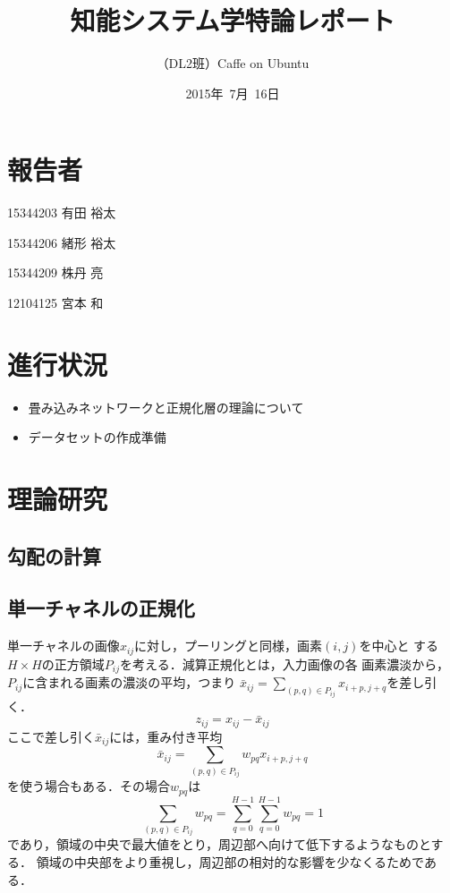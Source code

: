 \documentclass[a4paper,10pt]{jsarticle}
\title{知能システム学特論レポート}
\author{
（DL2班）Caffe on Ubuntu\\
}
\date{2015年\ 7月\ 16日}
\begin{document}
\maketitle
\section{報告者}
\begin{list}{}{}
 \item 15344203\hspace{0.5cm} 有田 裕太
 \item 15344206\hspace{0.5cm} 緒形 裕太
 \item 15344209\hspace{0.5cm} 株丹 亮
 \item 12104125\hspace{0.5cm} 宮本 和
\end{list}

\section{進行状況}

\begin{itemize}
\item 畳み込みネットワークと正規化層の理論について
\item データセットの作成準備
\end{itemize}

\section{理論研究}
\subsection{勾配の計算}


\subsection{単一チャネルの正規化}
単一チャネルの画像$x_{ij}$に対し，プーリングと同様，画素$(i,j)$を中心と
する$H\times H$の正方領域$P_{ij}$を考える．減算正規化とは，入力画像の各
画素濃淡から，$P_{ij}$に含まれる画素の濃淡の平均，つまり
$\bar{x}_{ij}= \sum_{(p,q)\in{P_{ij}}}^{} x_{i+p,j+q}$を差し引く．
\begin{equation}
 z_{ij} = x_{ij}-\bar{x}_{ij}
\end{equation}
ここで差し引く$\bar{x}_{ij}$には，重み付き平均
\begin{equation}
 \bar{x}_{ij}=\sum_{(p,q)\in{P_{ij}}} w_{pq}x_{i+p,j+q}
\end{equation}
を使う場合もある．その場合$w_{pq}$は
\begin{equation}
  \sum_{(p,q)\in{P_{ij}}}^{} w_{pq} = \sum_{q=0}^{H-1} \sum_{q=0}^{H-1} w_{pq}=1
\end{equation}
であり，領域の中央で最大値をとり，周辺部へ向けて低下するようなものとする．
領域の中央部をより重視し，周辺部の相対的な影響を少なくるためである．
\end{document}
